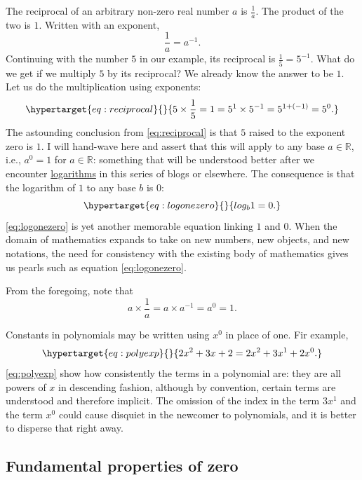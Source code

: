 \documentclass[
  a4paper,
]{article}
\begin{document}
The reciprocal of an arbitrary non-zero real number \(a\) is
\(\frac{1}{a}\). The product of the two is \(1\). Written with an
exponent, \[
\frac{1}{a} = a^{-1}.
\] Continuing with the number \(5\) in our example, its reciprocal is
\(\frac{1}{5} = 5^{-1}\). What do we get if we multiply \(5\) by its
reciprocal? We already know the answer to be \(1\). Let us do the
multiplication using exponents:
\begin{equation}\protect\hypertarget{eq:reciprocal}{}{
5 \times \frac{1}{5} = 1 = 5^{1} \times 5^{-1} = 5^{1+(-1)} = 5^{0}.
}\label{eq:reciprocal}\end{equation} The astounding conclusion from
\cref{eq:reciprocal} is that \(5\) raised to the exponent zero is
\({1}\). I will hand-wave here and assert that this will apply to any
base \(a \in \mathbb{R}\), i.e., \(a^0 = 1\) for \(a \in \mathbb{R}\):
something that will be understood better after we encounter
\href{https://www.britannica.com/science/logarithm}{logarithms} in this
series of blogs or elsewhere. The consequence is that the logarithm of
\(1\) to any base \(b\) is \(0\):
\begin{equation}\protect\hypertarget{eq:logonezero}{}{
log_{b}1 = 0.
}\label{eq:logonezero}\end{equation} \cref{eq:logonezero} is yet another
memorable equation linking \(1\) and \(0\). When the domain of
mathematics expands to take on new numbers, new objects, and new
notations, the need for consistency with the existing body of
mathematics gives us pearls such as equation \cref{eq:logonezero}.

From the foregoing, note that \[
a \times \frac{1}{a} = a \times a^{-1} = a^0 = 1.
\]

Constants in polynomials may be written using \(x^0\) in place of one.
Fir example, \begin{equation}\protect\hypertarget{eq:polyexp}{}{
2x^2 + 3x + 2 = 2x^2 + 3x^1 + 2x^0.
}\label{eq:polyexp}\end{equation} \cref{eq:polyexp} show how
consistently the terms in a polynomial are: they are all powers of \(x\)
in descending fashion, although by convention, certain terms are
understood and therefore implicit. The omission of the index in the term
\(3x^1\) and the term \(x^0\) could cause disquiet in the newcomer to
polynomials, and it is better to disperse that right away.

\hypertarget{fundamental-properties-of-zero}{%
\subsection{Fundamental properties of
zero}\label{fundamental-properties-of-zero}}
\end{document}
